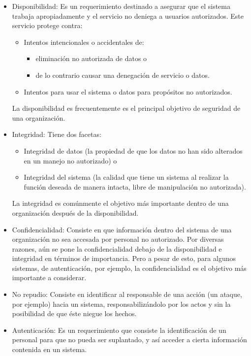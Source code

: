 \begin{itemize}

	\item Disponibilidad: Es un requerimiento destinado a asegurar que el sistema trabaja apropiadamente y el servicio no deniega a usuarios autorizados. Este servicio protege contra: 
		\begin{itemize}
		\item Intentos intencionales o accidentales de:
			\begin{itemize}
			\item eliminación no autorizada de datos o
			\item de lo contrario causar una denegación de servicio o datos.
			\end{itemize}
		\item Intentos para usar el sistema o datos para propósitos no autorizados.
		\end{itemize}
	La disponibilidad es frecuentemente es el principal objetivo de seguridad de una organización.
	
	\item Integridad: Tiene dos facetas: 
		\begin{itemize}
			\item Integridad de datos (la propiedad de que los datos no han sido alterados en un manejo no autorizado) o
			\item Integridad del sistema (la calidad que tiene un sistema al realizar la función deseada de manera intacta, libre de manipulación no autorizada).
		\end{itemize}
	La integridad es comúnmente el objetivo más importante dentro de una organización después de la disponibilidad.
	
	\item Confidencialidad: Consiste en que información dentro del sistema de una organización no sea accesada por personal no autorizado.
	Por diversas razones, aún se pone la confidencialidad debajo de la disponibilidad e integridad en términos de importancia. Pero a pesar de esto, para algunos sistemas, de autenticación, por ejemplo, la confidencialidad es el objetivo más importante a considerar. 
	
	\item No repudio: Consiste en identificar al responsable de una acción (un ataque, por ejemplo) hacia un sistema, responsabilizándolo por los actos y sin la posibilidad de que éste niegue los hechos.
	
	\item Autenticación: Es un requerimiento que consiste la identificación de un personal para que no pueda ser suplantado, y así acceder a cierta información contenida en un sistema.

\end{itemize}


